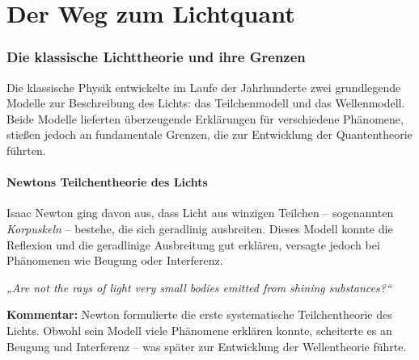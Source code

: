 \chapter{ Der Weg zum Lichtquant}

\setcounter{section}{2}
\setcounter{subsection}{0}
\setcounter{subsubsection}{1}
\setcounter{secnumdepth}{3}

\subsection{Die klassische Lichttheorie und ihre Grenzen}

Die klassische Physik entwickelte im Laufe der Jahrhunderte zwei grundlegende Modelle zur Beschreibung des Lichts: das Teilchenmodell und das Wellenmodell. Beide Modelle lieferten überzeugende Erklärungen für verschiedene Phänomene, stießen jedoch an fundamentale Grenzen, die zur Entwicklung der Quantentheorie führten.

\subsubsection{Newtons Teilchentheorie des Lichts}
Isaac Newton ging davon aus, dass Licht aus winzigen Teilchen – sogenannten \emph{Korpuskeln} – bestehe, die sich geradlinig ausbreiten. Dieses Modell konnte die Reflexion und die geradlinige Ausbreitung gut erklären, versagte jedoch bei Phänomenen wie Beugung oder Interferenz.
\vspace{1em}
\begin{tcolorbox}[physikbox, title=Isaac Newton(1704) Teilchentheorie\textit{ \cite{newton_opticks}}]
	\label{box:newton}
	
	\emph{„Are not the rays of light very small bodies emitted from shining substances?“}
	
	\vspace{6pt}
	\textbf{Kommentar:} Newton formulierte die erste systematische Teilchentheorie des Lichts. Obwohl sein Modell viele Phänomene erklären konnte, scheiterte es an Beugung und Interferenz – was später zur Entwicklung der Wellentheorie führte.
\end{tcolorbox}
